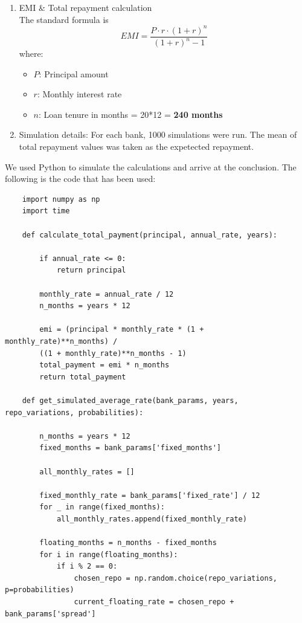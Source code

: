 \begin{itemize}
\begin{enumerate}
    \item EMI \& Total repayment calculation\\
    The standard formula is
    \[
    EMI = \frac{P \cdot r \cdot (1 + r)^n}{(1 + r)^n - 1}
    \]
    where:
    \begin{itemize}
        \item $P$: Principal amount
        \item $r$: Monthly interest rate
        \item $n$: Loan tenure in months = 20*12 = \textbf{240 months}
    \end{itemize}

    \item Simulation details:
    For each bank, 1000 simulations were run. The mean of total repayment values was taken as the expetected repayment.
\end{enumerate}

We used Python to simulate the calculations and arrive at the conclusion. The following is
the code that has been used:

\begin{verbatim}
    import numpy as np
    import time
    
    def calculate_total_payment(principal, annual_rate, years):
    
        if annual_rate <= 0:
            return principal
    
        monthly_rate = annual_rate / 12
        n_months = years * 12
    
        emi = (principal * monthly_rate * (1 + monthly_rate)**n_months) / 
        ((1 + monthly_rate)**n_months - 1)
        total_payment = emi * n_months
        return total_payment
    
    def get_simulated_average_rate(bank_params, years, repo_variations, probabilities):
    
        n_months = years * 12
        fixed_months = bank_params['fixed_months']
    
        all_monthly_rates = []
    
        fixed_monthly_rate = bank_params['fixed_rate'] / 12
        for _ in range(fixed_months):
            all_monthly_rates.append(fixed_monthly_rate)
    
        floating_months = n_months - fixed_months
        for i in range(floating_months):
            if i % 2 == 0:
                chosen_repo = np.random.choice(repo_variations, p=probabilities)
                current_floating_rate = chosen_repo + bank_params['spread']
    

\end{verbatim}
\end{itemize}
